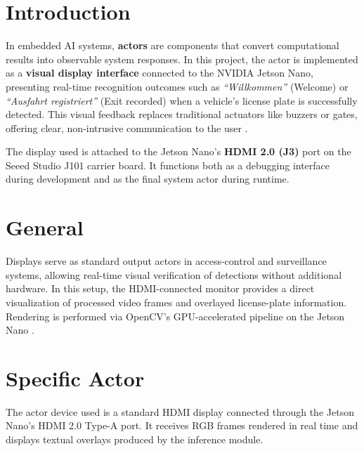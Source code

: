 \section{Introduction}
In embedded AI systems, \textbf{actors} are components that convert computational results into observable system responses.  
In this project, the actor is implemented as a \textbf{visual display interface} connected to the NVIDIA Jetson Nano, presenting real-time recognition outcomes such as \textit{“Willkommen”} (Welcome) or \textit{“Ausfahrt registriert”} (Exit recorded) when a vehicle’s license plate is successfully detected.  
This visual feedback replaces traditional actuators like buzzers or gates, offering clear, non-intrusive communication to the user \cite{edgeAIbook, opencv_doc_2024}.  

The display used is attached to the Jetson Nano’s \textbf{HDMI 2.0 (J3)} port on the Seeed Studio J101 carrier board.  
It functions both as a debugging interface during development and as the final system actor during runtime.

\section{General}
Displays serve as standard output actors in access-control and surveillance systems, allowing real-time visual verification of detections without additional hardware.  
In this setup, the HDMI-connected monitor provides a direct visualization of processed video frames and overlayed license-plate information.  
Rendering is performed via OpenCV’s GPU-accelerated pipeline on the Jetson Nano \cite{jetson_nano_doc}.

\section{Specific Actor}
\label{sec:display_specs}
The actor device used is a standard HDMI display connected through the Jetson Nano’s HDMI 2.0 Type-A port.  
It receives RGB frames rendered in real time and displays textual overlays produced by the inference module.

